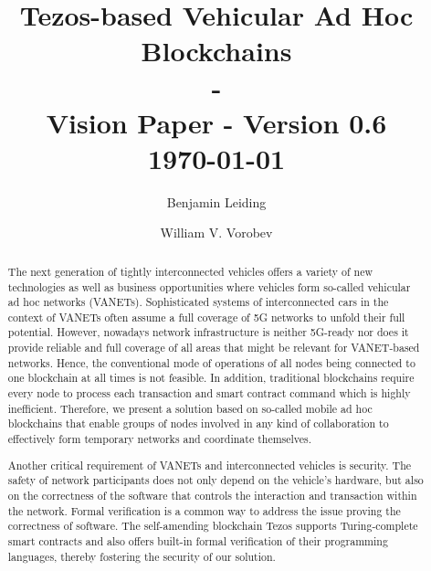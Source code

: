\documentclass{llncs}
\begin{document}
	{
	\title{Tezos-based Vehicular Ad Hoc Blockchains\\ - \\ \small Vision Paper - Version 0.6\\\small \today}
	
	\author{Benjamin Leiding \and William V. Vorobev}
	
	
	\maketitle


	\begin{abstract}


		The next generation of tightly interconnected vehicles offers a variety of new technologies as well as business opportunities where vehicles form so-called vehicular ad hoc networks (VANETs). Sophisticated systems of interconnected cars in the context of VANETs often assume a full coverage of 5G networks to unfold their full potential. However, nowadays network infrastructure is neither 5G-ready nor does it provide reliable and full coverage of all areas that might be relevant for VANET-based networks. Hence, the conventional mode of operations of all nodes being connected to one blockchain at all times is not feasible. In addition, traditional blockchains require every node to process each transaction and smart contract command which is highly inefficient. Therefore, we present a solution based on so-called mobile ad hoc blockchains that enable groups of nodes involved in any kind of collaboration to effectively form temporary networks and coordinate themselves. 

		Another critical requirement of VANETs and interconnected vehicles is security. The safety of network participants does not only depend on the vehicle's hardware, but also on the correctness of the software that controls the interaction and transaction within the network. Formal verification is a common way to address the issue proving the correctness of software. The self-amending blockchain Tezos supports Turing-complete smart contracts and also offers built-in formal verification of their programming languages, thereby fostering the security of our solution.


\end{abstract}}
\end{document}
